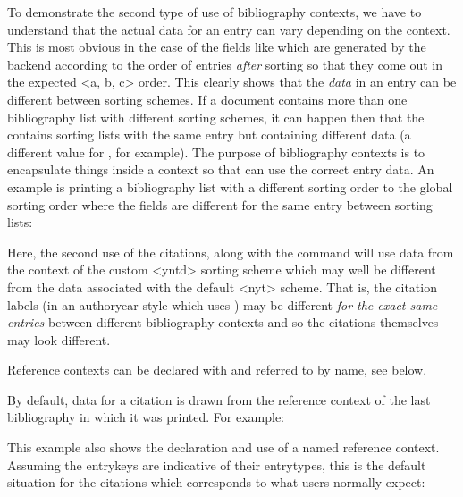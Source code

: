 To demonstrate the second type of use of bibliography contexts, we have to understand that the actual data for an entry can vary depending on the context. This is most obvious in the case of the  fields like  which are generated by the backend according to the order of entries \emph{after} sorting so that they come out in the expected <a, b, c> order. This clearly shows that the \emph{data} in an entry can be different between sorting schemes. If a document contains more than one bibliography list with different sorting schemes, it can happen then that the  contains sorting lists with the same entry but containing different data (a different value for , for example). The purpose of bibliography contexts is to encapsulate things inside a context so that \biblatex can use the correct entry data. An example is printing a bibliography list with a different sorting order to the global sorting order where the  fields are different for the same entry between sorting lists:

\begin{ltxexample}
\usepackage[sorting=nyt,style=authoryear]{biblatex}

\cite{one}
\cite{two}
\printbibliography
\newrefcontext[sorting=yntd]
\cite{one}
\cite{two}
\printbibliography
\end{ltxexample}
%
Here, the second use of the citations, along with the  command will use data from the context of the custom <yntd> sorting scheme which may well be different from the data associated with the default <nyt> scheme. That is, the citation labels (in an authoryear style which uses ) may be different \emph{for the exact same entries} between different bibliography contexts and so the citations themselves may look different.

Reference contexts can be declared with  and referred to by name, see below.

By default, data for a citation is drawn from the reference context of the last bibliography in which it was printed. For example:

\begin{ltxexample}[style=latex]{}


\cite{book, article, misc}

\printbibliography[type=book]

\printbibliography[type=article]

\newrefcontext[sorting=ydnt]
\printbibliography[type=misc]


\end{ltxexample}
%
This example also shows the declaration and use of a named reference context. Assuming the entrykeys are indicative of their entrytypes, this is the default situation for the citations which corresponds to what users normally expect:

